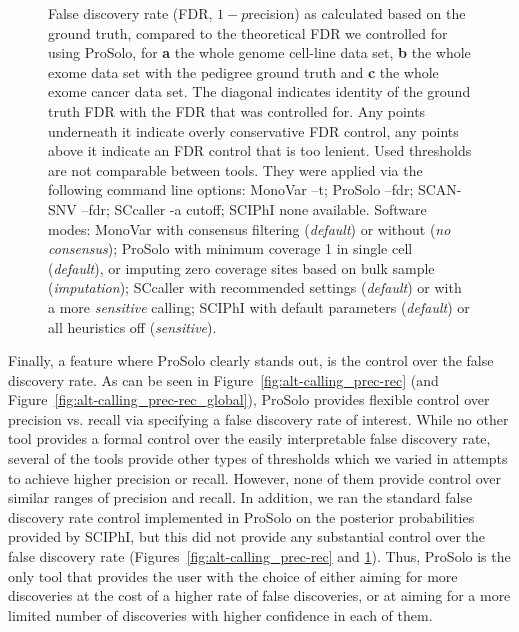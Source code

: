\documentclass[authoryear,preprint,11pt]{scrartcl}
\begin{document}
\begin{figure}[!tpb]
\begin{minipage}[t]{.99\linewidth}
 \end{minipage}
 \caption{
 False discovery rate (FDR, $1 - p$recision) as calculated based on the ground truth, compared to the theoretical FDR we controlled for using ProSolo, for \textbf{a} the whole genome cell-line data set, \textbf{b} the whole exome data set with the pedigree ground truth and \textbf{c} the whole exome cancer data set.
 The diagonal indicates identity of the ground truth FDR with the FDR that was controlled for.
 Any points underneath it indicate overly conservative FDR control, any points above it indicate an FDR control that is too lenient.\newline \footnotesize
  Used thresholds are not comparable between tools.
  They were applied via the following command line options:
  MonoVar {\ttfamily --t};
  ProSolo {\ttfamily --fdr};
  SCAN-SNV {\ttfamily --fdr};
  SCcaller {\ttfamily -a cutoff};
  SCIPhI {\ttfamily none available}.
  Software modes:
  MonoVar with consensus filtering ({\itshape default}) or without ({\itshape no consensus});
  ProSolo with minimum coverage 1 in single cell ({\itshape default}), or imputing zero coverage sites based on bulk sample ({\itshape imputation});
  SCcaller with recommended settings ({\itshape default}) or with a more {\itshape sensitive} calling;
  SCIPhI with default parameters ({\itshape default}) or all heuristics off ({\itshape sensitive}).
 }
 \label{fig:FDR-ground-truth-vs-theoretical}
\end{figure}

Finally, a feature where ProSolo clearly stands out, is the control over the false discovery rate.
As can be seen in Figure~\ref{fig:alt-calling_prec-rec} (and Figure~\ref{fig:alt-calling_prec-rec_global}), ProSolo provides flexible control over precision vs. recall via specifying a false discovery rate of interest.
While no other tool provides a formal control over the easily interpretable false discovery rate, several of the tools provide other types of thresholds which we varied in attempts to achieve higher precision or recall.
However, none of them provide control over similar ranges of precision and recall.
In addition, we ran the standard false discovery rate control implemented in ProSolo on the posterior probabilities provided by SCIPhI, but this did not provide any substantial control over the false discovery rate (Figures~\ref{fig:alt-calling_prec-rec} and \ref{fig:FDR-ground-truth-vs-theoretical}).
Thus, ProSolo is the only tool that provides the user with the choice of either aiming for more discoveries at the cost of a higher rate of false discoveries, or at aiming for a more limited number of discoveries with higher confidence in each of them.
\end{document}
